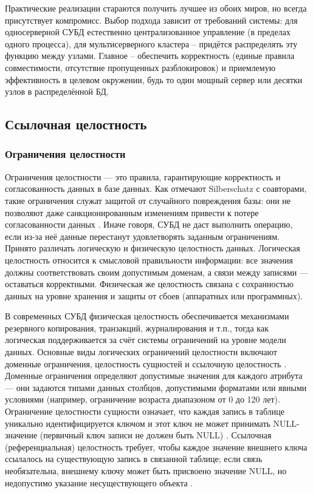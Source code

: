  Практические реализации стараются получить лучшее из обоих миров, но всегда присутствует компромисс. Выбор подхода зависит от требований системы: для односерверной СУБД естественно централизованное управление (в пределах одного процесса), для мультисерверного кластера – придётся распределять эту функцию между узлами. Главное – обеспечить корректность (единые правила совместимости, отсутствие пропущенных разблокировок) и приемлемую эффективность в целевом окружении, будь то один мощный сервер или десятки узлов в распределённой БД.

\subsection{Ссылочная целостность}
\subsubsection{Ограничения целостности}
\label{subsec:integrity_constraints}

 Ограничения целостности — это правила, гарантирующие корректность и согласованность данных в базе данных. Как отмечают Silberschatz с соавторами, такие ограничения служат защитой от случайного повреждения базы: они не позволяют даже санкционированным изменениям привести к потере согласованности данных \autocite{Silberschatz}. Иначе говоря, СУБД не даст выполнить операцию, если из-за неё данные перестанут удовлетворять заданным ограничениям. Принято различать логическую и физическую целостность данных. Логическая целостность относится к смысловой правильности информации: все значения должны соответствовать своим допустимым доменам, а связи между записями — оставаться корректными. Физическая же целостность связана с сохранностью данных на уровне хранения и защиты от сбоев (аппаратных или программных). 
 
 В современных СУБД физическая целостность обеспечивается механизмами резервного копирования, транзакций, журналирования и т.п., тогда как логическая поддерживается за счёт системы ограничений на уровне модели данных. Основные виды логических ограничений целостности включают доменные ограничения, целостность сущностей и ссылочную целостность \autocite{ElmasriNavathe}. Доменные ограничения определяют допустимые значения для каждого атрибута — они задаются типами данных столбцов, допустимыми форматами или явными условиями (например, ограничение возраста диапазоном от 0 до 120 лет). Ограничение целостности сущности означает, что каждая запись в таблице уникально идентифицируется ключом и этот ключ не может принимать NULL-значение (первичный ключ записи не должен быть NULL) \autocite{ElmasriNavathe}. Ссылочная (референциальная) целостность требует, чтобы каждое значение внешнего ключа ссылалось на существующую запись в связанной таблице; если связь необязательна, внешнему ключу может быть присвоено значение NULL, но недопустимо указание несуществующего объекта \autocite{ElmasriNavathe}.

